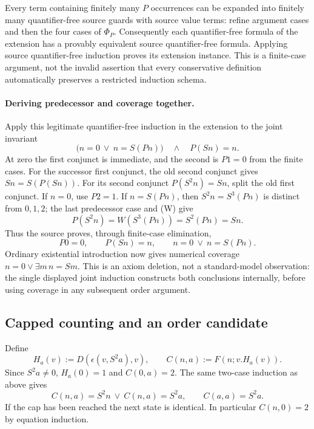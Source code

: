 \documentclass[11pt,letterpaper]{article}
\theoremstyle{definition}\newtheorem{definition}[theorem]{Definition}
\theoremstyle{remark}\newtheorem{remark}[theorem]{Remark}
\begin{document}
Every term containing finitely many $P$ occurrences can be expanded
into finitely many quantifier-free source guards with source value
terms: refine argument cases and then the four cases of $\Phi_P$.
Consequently each quantifier-free formula of the extension has a
provably equivalent source quantifier-free formula. Applying source
quantifier-free induction proves its extension instance. This is a
finite-case argument, not the invalid assertion that every conservative
definition automatically preserves a restricted induction schema.

\paragraph{Deriving predecessor and coverage together.}
Apply this legitimate quantifier-free induction in the extension to
the joint invariant
\[
 \bigl(n=0\ \lor\ n=S(Pn)\bigr)\quad\wedge\quad P(Sn)=n.
 \tag{Joint invariant}
\]
At zero the first conjunct is immediate, and the second is $P1=0$
from the finite cases. For the successor first conjunct, the old
second conjunct gives $Sn=S(P(Sn))$. For its second conjunct
$P(S^2n)=Sn$, split the old first conjunct. If $n=0$, use $P2=1$.
If $n=S(Pn)$, then $S^2n=S^3(Pn)$ is distinct from $0,1,2$;
the last predecessor case and (W) give
\[
 P(S^2n)=W(S^3(Pn))=S^2(Pn)=Sn.
\]
Thus the source proves, through finite-case elimination,
\[
 P0=0,\qquad P(Sn)=n,\qquad n=0\ \lor\ n=S(Pn).
\]
Ordinary existential introduction now gives numerical coverage
$n=0\lor\exists m\,n=Sm$. This is an axiom deletion, not a
standard-model observation: the single displayed joint induction
constructs both conclusions internally, before using coverage in
any subsequent order argument.

\subsection{Capped counting and an order candidate}
Define
\[
H_a(v):=D(\epsilon(v,S^2a),v),\qquad C(n,a):=F(n;v.H_a(v)).
\]
Since $S^2a\ne0$, $H_a(0)=1$ and $C(0,a)=2$. The same two-case
induction as above gives
\[
C(n,a)=S^2n\ \lor\ C(n,a)=S^2a,\qquad C(a,a)=S^2a.
\tag{C-invariant}
\]
If the cap has been reached the next state is identical. In particular
$C(n,0)=2$ by equation induction.
\end{document}
